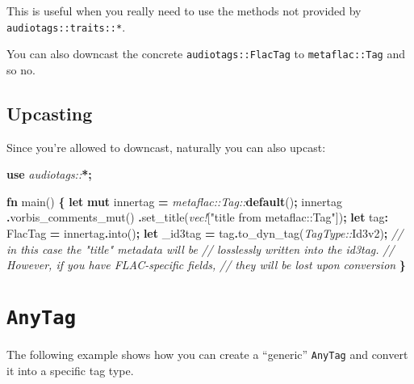 \documentclass[
]{book}
\newenvironment{Shaded}{\begin{snugshade}}{\end{snugshade}}
\newcommand{\CommentTok}[1]{\textcolor[rgb]{0.56,0.35,0.01}{\textit{#1}}}
\newcommand{\KeywordTok}[1]{\textcolor[rgb]{0.13,0.29,0.53}{\textbf{#1}}}
\newcommand{\NormalTok}[1]{#1}
\newcommand{\OperatorTok}[1]{\textcolor[rgb]{0.81,0.36,0.00}{\textbf{#1}}}
\newcommand{\PreprocessorTok}[1]{\textcolor[rgb]{0.56,0.35,0.01}{\textit{#1}}}
\newcommand{\StringTok}[1]{\textcolor[rgb]{0.31,0.60,0.02}{#1}}
\begin{document}
This is useful when you really need to use the methods not provided by \texttt{audiotags::traits::*}.

You can also downcast the concrete \texttt{audiotags::FlacTag} to \texttt{metaflac::Tag} and so no.

\hypertarget{upcasting}{%
\section{Upcasting}\label{upcasting}}

Since you're allowed to downcast, naturally you can also upcast:

\begin{Shaded}
\begin{Highlighting}[]
\KeywordTok{use} \PreprocessorTok{audiotags::}\OperatorTok{*;}

\KeywordTok{fn}\NormalTok{ main() }\OperatorTok{\{}
    \KeywordTok{let} \KeywordTok{mut}\NormalTok{ innertag }\OperatorTok{=} \PreprocessorTok{metaflac::Tag::}\KeywordTok{default}\NormalTok{()}\OperatorTok{;}
\NormalTok{    innertag}
        \OperatorTok{.}\NormalTok{vorbis\_comments\_mut()}
        \OperatorTok{.}\NormalTok{set\_title(}\PreprocessorTok{vec!}\NormalTok{[}\StringTok{"title from metaflac::Tag"}\NormalTok{])}\OperatorTok{;}
    \KeywordTok{let}\NormalTok{ tag}\OperatorTok{:}\NormalTok{ FlacTag }\OperatorTok{=}\NormalTok{ innertag}\OperatorTok{.}\NormalTok{into()}\OperatorTok{;}
    \KeywordTok{let}\NormalTok{ \_id3tag }\OperatorTok{=}\NormalTok{ tag}\OperatorTok{.}\NormalTok{to\_dyn\_tag(}\PreprocessorTok{TagType::}\NormalTok{Id3v2)}\OperatorTok{;}
    \CommentTok{// in this case the "title" metadata will be}
    \CommentTok{// losslessly written into the id3tag.}
    \CommentTok{// However, if you have FLAC{-}specific fields,}
    \CommentTok{// they will be lost upon conversion}
\OperatorTok{\}}
\end{Highlighting}
\end{Shaded}

\hypertarget{anytag}{%
\chapter{\texorpdfstring{\texttt{AnyTag}}{AnyTag}}\label{anytag}}

The following example shows how you can create a ``generic'' \texttt{AnyTag} and convert it into a specific tag type.
\end{document}
